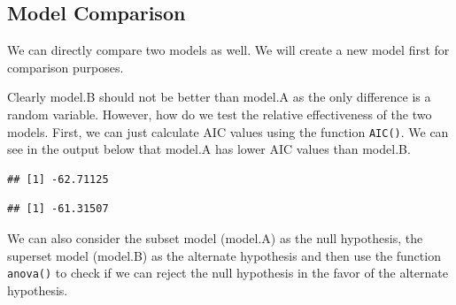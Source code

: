 \documentclass[10pt, letterpaper, twoside]{memoir}\usepackage{knitr}
\begin{document}
\subsection{Model Comparison}

We can directly compare two models as well. We will create a new model first for comparison purposes.

\begin{knitrout}
\color{fgcolor}\begin{kframe}
\begin{alltt}
\hlopt{$} \hlkwb{<-} \hlstd{(}  
 \hlkwb{<-} \hlstd{(} \hlopt{~}  \hlopt{+}   
 \hlkwb{<-} \hlstd{(} \hlopt{~}  \hlopt{+}  \hlopt{+} \hlopt{$}  
\end{alltt}
\end{kframe}
\end{knitrout}

Clearly model.B should not be better than model.A as the only difference is a random variable. However, how do we test the relative effectiveness of the two models. First, we can just calculate AIC values using the function \texttt{AIC()}. We can see in the output below that model.A has lower AIC values than model.B.

\begin{knitrout}
\color{fgcolor}\begin{kframe}
\begin{alltt}
\end{alltt}
\begin{verbatim}
## [1] -62.71125
\end{verbatim}
\begin{alltt}
\end{alltt}
\begin{verbatim}
## [1] -61.31507
\end{verbatim}
\end{kframe}
\end{knitrout}

We can also consider the subset model (model.A) as the null hypothesis, the superset model (model.B) as the alternate hypothesis and then use the function \texttt{anova()} to check if we can reject the null hypothesis in the favor of the alternate hypothesis.
\end{document}
